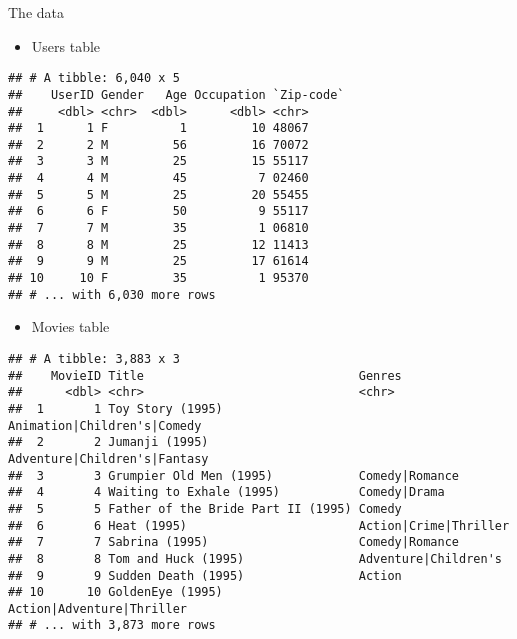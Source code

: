 \documentclass[ignorenonframetext,]{beamer}
\providecommand{\tightlist}{%
  \setlength{\itemsep}{0pt}\setlength{\parskip}{0pt}}
\begin{document}
\begin{frame}[fragile]{The data}
\protect\hypertarget{the-data}{}

\begin{itemize}
\tightlist
\item
  Users table
\end{itemize}

\begin{verbatim}
## # A tibble: 6,040 x 5
##    UserID Gender   Age Occupation `Zip-code`
##     <dbl> <chr>  <dbl>      <dbl> <chr>     
##  1      1 F          1         10 48067     
##  2      2 M         56         16 70072     
##  3      3 M         25         15 55117     
##  4      4 M         45          7 02460     
##  5      5 M         25         20 55455     
##  6      6 F         50          9 55117     
##  7      7 M         35          1 06810     
##  8      8 M         25         12 11413     
##  9      9 M         25         17 61614     
## 10     10 F         35          1 95370     
## # ... with 6,030 more rows
\end{verbatim}

\end{frame}

\begin{frame}[fragile]

\begin{itemize}
\tightlist
\item
  Movies table
\end{itemize}

\begin{verbatim}
## # A tibble: 3,883 x 3
##    MovieID Title                              Genres                      
##      <dbl> <chr>                              <chr>                       
##  1       1 Toy Story (1995)                   Animation|Children's|Comedy 
##  2       2 Jumanji (1995)                     Adventure|Children's|Fantasy
##  3       3 Grumpier Old Men (1995)            Comedy|Romance              
##  4       4 Waiting to Exhale (1995)           Comedy|Drama                
##  5       5 Father of the Bride Part II (1995) Comedy                      
##  6       6 Heat (1995)                        Action|Crime|Thriller       
##  7       7 Sabrina (1995)                     Comedy|Romance              
##  8       8 Tom and Huck (1995)                Adventure|Children's        
##  9       9 Sudden Death (1995)                Action                      
## 10      10 GoldenEye (1995)                   Action|Adventure|Thriller   
## # ... with 3,873 more rows
\end{verbatim}

\end{frame}
\end{document}
